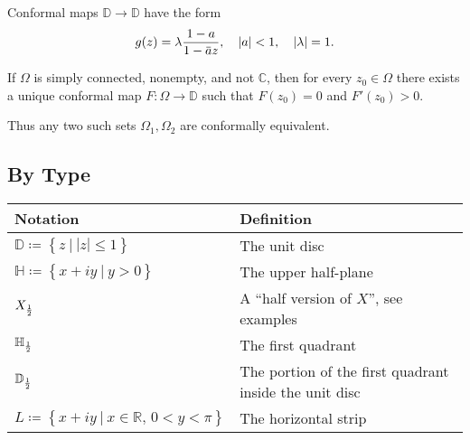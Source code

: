 \begin{theorem}

Conformal maps \({\mathbb{D}}\to{\mathbb{D}}\) have the form
\begin{align*}
g(z) = \lambda {1-a \over 1 - \mkern 1.5mu\overline{\mkern-1.5mua\mkern-1.5mu}\mkern 1.5mu z}, \quad {\left\lvert {a} \right\rvert} < 1, \quad {\left\lvert {\lambda} \right\rvert} = 1
.\end{align*}

\end{theorem}

\begin{theorem}

If \(\Omega\) is simply connected, nonempty, and not \({\mathbb{C}}\),
then for every \(z_{0}\in \Omega\) there exists a unique conformal map
\(F:\Omega \to {\mathbb{D}}\) such that \(F(z_{0}) = 0\) and
\(F'(z_{0}) > 0\).

Thus any two such sets \(\Omega_{1}, \Omega_{2}\) are conformally
equivalent.

\end{theorem}

\hypertarget{by-type}{%
\subsection{By Type}\label{by-type}}

\begin{remark}[Notation]

\begin{longtable}[]{@{}
  >{\raggedright\arraybackslash}p{}
  >{\raggedright\arraybackslash}p{}@{}}
\toprule
Notation & Definition \\
\midrule
\endhead
\({\mathbb{D}}\coloneqq\left\{{z {~\mathrel{\Big|}~}{\left\lvert {z} \right\rvert} \leq 1}\right\}\)
& The unit disc \\
\({\mathbb{H}}\coloneqq\left\{{x+iy {~\mathrel{\Big|}~}y > 0}\right\}\)
& The upper half-plane \\
\(X_{1\over 2}\) & A ``half version of \(X\)'', see examples \\
\({\mathbb{H}}_{1\over 2}\) & The first quadrant \\
\({\mathbb{D}}_{1\over 2}\) & The portion of the first quadrant inside
the unit disc \\
\(L \coloneqq\left\{{x + iy {~\mathrel{\Big|}~}x\in {\mathbb{R}},\, 0<y<\pi}\right\}\)
& The horizontal strip \\
\bottomrule
\end{longtable}

\end{remark}

